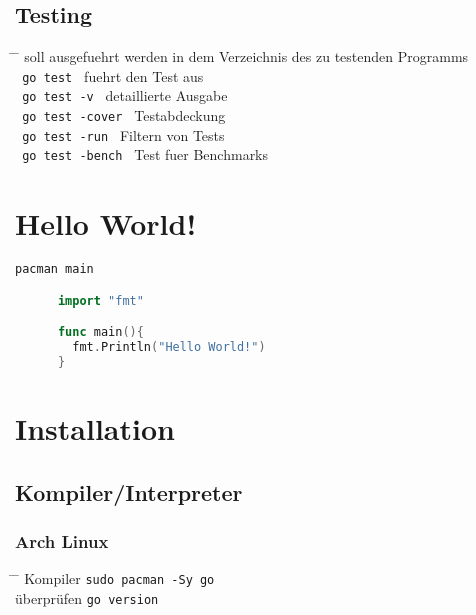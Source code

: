 \documentclass[twoside,a4paper,12pt]{article}
\begin{document}
\subsection{Testing}
\begin{tabbing}
  \hspace{2mm} \= \hspace{50mm} \= \kill
  \> soll ausgefuehrt werden in dem Verzeichnis des zu testenden Programms \\ 
  \> \verb| go test | \> fuehrt den Test aus \\ 
  \> \verb| go test -v | \> detaillierte Ausgabe \\ 
  \> \verb| go test -cover | \> Testabdeckung \\ 
  \> \verb| go test -run | \> Filtern von Tests \\ 
  \> \verb| go test -bench | \> Test fuer Benchmarks \\ 
\end{tabbing}

\section{Hello World!}
\begin{center}
  \begin{minipage}{1.0\textwidth}
    \begin{lstlisting}[language=Go]
      pacman main

      import "fmt"

      func main(){
        fmt.Println("Hello World!")
      }
    \end{lstlisting}
  \end{minipage}
\end{center}

\newpage
\section{Installation}
\subsection{Kompiler/Interpreter}
\subsubsection{Arch Linux}
\begin{tabbing}
  \hspace{2mm} \= \hspace{30mm} \= \kill
  \> Kompiler \> \verb|sudo pacman -Sy go| \\ 
  \> überprüfen \> \verb|go version| \\
\end{tabbing}
\end{document}
